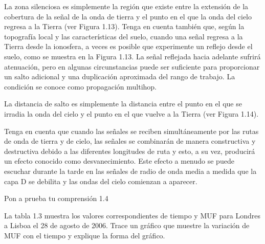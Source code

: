 La zona silenciosa es simplemente la región que existe entre la extensión de la cobertura de la señal de la onda de tierra y el punto en el que la onda del cielo regresa a la Tierra (ver Figura 1.13). Tenga en cuenta también que, según la topografía local y las características del suelo, cuando una señal regresa a la Tierra desde la ionosfera, a veces es posible que experimente un reflejo desde el suelo, como se muestra en la Figura 1.13. La señal reflejada hacia adelante sufrirá atenuación, pero en algunas circunstancias puede ser suficiente para proporcionar un salto adicional y una duplicación aproximada del rango de trabajo. La condición se conoce como propagación multihop.

La distancia de salto es simplemente la distancia entre el punto en el que se irradia la onda del cielo y el punto en el que vuelve a la Tierra (ver Figura 1.14).

Tenga en cuenta que cuando las señales se reciben simultáneamente por las rutas de onda de tierra y de cielo, las señales se combinarán de manera constructiva y destructiva debido a las diferentes longitudes de ruta y esto, a su vez, producirá un efecto conocido como desvanecimiento. Este efecto a menudo se puede escuchar durante la tarde en las señales de radio de onda media a medida que la capa D se debilita y las ondas del cielo comienzan a aparecer.

Pon a prueba tu comprensión 1.4

La tabla 1.3 muestra los valores correspondientes de tiempo y \ac{MUF} para Londres a Lisboa el 28 de agosto de 2006. Trace un gráfico que muestre la variación de \ac{MUF} con el tiempo y explique la forma del gráfico.
